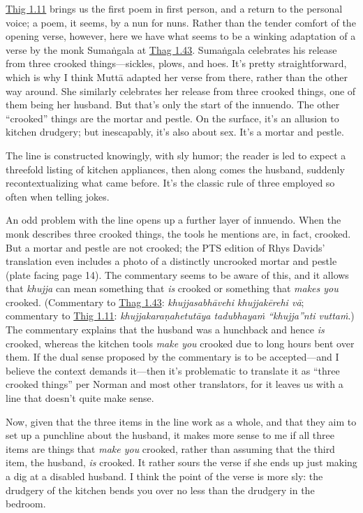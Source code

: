\documentclass[12pt,openany]{book}%
\begin{document}
\href{https://suttacentral.net/thig1.11}{Thig 1.11} brings us the first poem in first person, and a return to the personal voice; a poem, it seems, by a nun for nuns. Rather than the tender comfort of the opening verse, however, here we have what seems to be a winking adaptation of a verse by the monk \textsanskrit{Sumaṅgala} at \href{https://suttacentral.net/thag1.43/en/sujato}{Thag 1.43}. \textsanskrit{Sumaṅgala} celebrates his release from three crooked things—sickles, plows, and hoes. It’s pretty straightforward, which is why I think \textsanskrit{Muttā} adapted her verse from there, rather than the other way around. She similarly celebrates her release from three crooked things, one of them being her husband. But that’s only the start of the innuendo. The other “crooked” things are the mortar and pestle. On the surface, it’s an allusion to kitchen drudgery; but inescapably, it’s also about sex. It’s a mortar and pestle.

The line is constructed knowingly, with sly humor; the reader is led to expect a threefold listing of kitchen appliances, then along comes the husband, suddenly recontextualizing what came before. It’s the classic rule of three employed so often when telling jokes.

An odd problem with the line opens up a further layer of innuendo. When the monk describes three crooked things, the tools he mentions are, in fact, crooked. But a mortar and pestle are not crooked; the PTS edition of Rhys Davids’ translation even includes a photo of a distinctly uncrooked mortar and pestle (plate facing page 14). The commentary seems to be aware of this, and it allows that \textit{khujja} can mean something that \emph{is} crooked or something that \emph{makes you} crooked. (Commentary to \href{https://suttacentral.net/thag1.43/en/sujato}{Thag 1.43}: \textit{\textsanskrit{khujjasabhāvehi} khujjakērehi \textsanskrit{vā}}; commentary to \href{https://suttacentral.net/thig1.11}{Thig 1.11}: \textit{\textsanskrit{khujjakaraṇahetutāya} \textsanskrit{tadubhayaṁ} “khujja”nti \textsanskrit{vuttaṁ}}.) The commentary explains that the husband was a hunchback and hence \emph{is} crooked, whereas the kitchen tools \emph{make you} crooked due to long hours bent over them. If the dual sense proposed by the commentary is to be accepted—and I believe the context demands it—then it’s problematic to translate it as “three crooked things” per Norman and most other translators, for it leaves us with a line that doesn’t quite make sense.

Now, given that the three items in the line work as a whole, and that they aim to set up a punchline about the husband, it makes more sense to me if all three items are things that \emph{make you} crooked, rather than assuming that the third item, the husband, \emph{is} crooked. It rather sours the verse if she ends up just making a dig at a disabled husband. I think the point of the verse is more sly: the drudgery of the kitchen bends you over no less than the drudgery in the bedroom.
\end{document}
